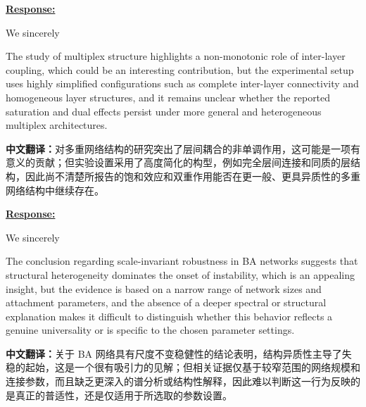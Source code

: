 \documentclass[a4paper,12pt]{article}
\newcommand{\zhtranslationfirst}[1]{%
    \par\medskip\noindent
    {\small\color{blue!60!black}\textbf{中文翻译：}#1}\par
}
\begin{document}
\noindent \underline {\textbf{Response:}}
\bigskip

We sincerely

\newpage
\begin{tcolorbox}[title = {Comment 4},fonttitle = \bfseries]
    The study of multiplex structure highlights a non-monotonic role of inter-layer coupling, which could be an interesting contribution, but the experimental setup uses highly simplified configurations such as complete inter-layer connectivity and homogeneous layer structures, and it remains unclear whether the reported saturation and dual effects persist under more general and heterogeneous multiplex architectures.
    \zhtranslationfirst{对多重网络结构的研究突出了层间耦合的非单调作用，这可能是一项有意义的贡献；但实验设置采用了高度简化的构型，例如完全层间连接和同质的层结构，因此尚不清楚所报告的饱和效应和双重作用能否在更一般、更具异质性的多重网络结构中继续存在。}
\end{tcolorbox}

\noindent \underline {\textbf{Response:}}
\bigskip

We sincerely

\newpage
\begin{tcolorbox}[title = {Comment 5},fonttitle = \bfseries]
    The conclusion regarding scale-invariant robustness in BA networks suggests that structural heterogeneity dominates the onset of instability, which is an appealing insight, but the evidence is based on a narrow range of network sizes and attachment parameters, and the absence of a deeper spectral or structural explanation makes it difficult to distinguish whether this behavior reflects a genuine universality or is specific to the chosen parameter settings.
    \zhtranslationfirst{关于 BA 网络具有尺度不变稳健性的结论表明，结构异质性主导了失稳的起始，这是一个很有吸引力的见解；但相关证据仅基于较窄范围的网络规模和连接参数，而且缺乏更深入的谱分析或结构性解释，因此难以判断这一行为反映的是真正的普适性，还是仅适用于所选取的参数设置。}
\end{tcolorbox}
\end{document}
